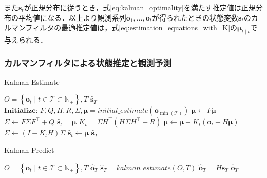        また$\bm{s}_t$が正規分布に従うとき，式\ref{eq:kalman_optimality}を満たす推定値は正規分布の平均値になる．以上より観測系列$\bm{o}_1, \dots, \bm{o}_t$が得られたときの状態変数$\bm{s}_t$のカルマンフィルタの最適推定値は，式\ref{eq:estimation_equations_with_K}の$\bm{\mu}_{t \mid t}$で与えられる．

        \subsubsection{カルマンフィルタによる状態推定と観測予測}

        \begin{algorithm}[t]
            \caption[Kalman Estimate]{Kalman Estimate}
            \label{alg:kalman_estimate}
            \begin{algorithmic}[1]
                \Require $O = \left\{\bm{o}_t \mid t \in \mathcal{T} \subset \mathbb{N}_+\right\}, T$
                \Ensure $\hat{\bm{s}}_T$
                \State $\textbf{Initialize: } F, Q, H, R, \Sigma, \bm{\mu} = initial\_estimate(\bm{o}_{\min(\mathcal{T})})$
                    \State $\bm{\mu} \gets F \bm{\mu}$
                    \State $\Sigma \gets F \Sigma F^{\top} + Q$
                    \State $\hat{\bm{s}}_t = \bm{\mu}$
                        \State $K_t = \Sigma H^{\top} \left( H \Sigma H^{\top} + R\right)$
                        \State $\bm{\mu} \gets \bm{\mu} + K_t \left( \bm{o}_t - H \bm{\mu} \right)$
                        \State $\Sigma \gets \left( I - K_t H \right) \Sigma$
                        \State $\hat{\bm{s}}_t \gets \bm{\mu}$
                    \EndIf
                \EndFor
                \State \Return $\hat{\bm{s}}_T$
            \end{algorithmic}
        \end{algorithm}

        \begin{algorithm}[t]
            \caption[Kalman Predict]{Kalman Predict}
            \label{alg:kalman_predict}
            \begin{algorithmic}[1]
                \Require $O = \left\{\bm{o}_t \mid t \in \mathcal{T} \subset \mathbb{N}_+\right\}, T$
                \Ensure $\hat{\bm{o}}_T$
                \State $\hat{\bm{s}}_T = kalman\_estimate(O, T)$
                \State $\hat{\bm{o}}_T = H \hat{\bm{s}}_T$
                \State \Return $\hat{\bm{o}}_T$
            \end{algorithmic}
        \end{algorithm}


